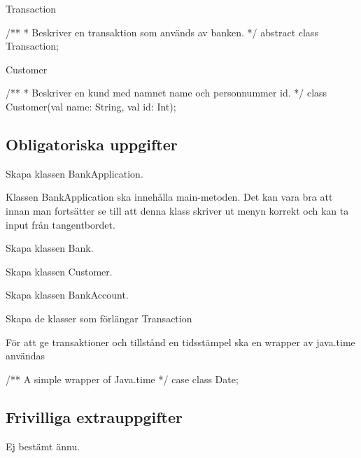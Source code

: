 Transaction

\begin{Code}
/**
 * Beskriver en transaktion som används av banken.
 */
abstract class Transaction;

\end{Code}


Customer

\begin{Code}
/**
 * Beskriver en kund med namnet name och personnummer id.
 */
class Customer(val name: String, val id: Int);

\end{Code}



\subsection{Obligatoriska uppgifter}

\Task Skapa klassen BankApplication.

\Subtask Klassen BankApplication ska innehålla main-metoden. Det kan vara bra att innan man fortsätter se till att denna klass skriver ut menyn korrekt och kan ta input från tangentbordet.

\Task Skapa klassen Bank.

\Task Skapa klassen Customer.

\Task Skapa klassen BankAccount.

\Task Skapa de klasser som förlängar Transaction

\Task För att ge transaktioner och tillstånd en tidsstämpel ska en wrapper av java.time användas

\begin{Code}
/** A simple wrapper of Java.time */
case class Date;
\end{Code}

\subsection{Frivilliga extrauppgifter}

\Task Ej bestämt ännu.


